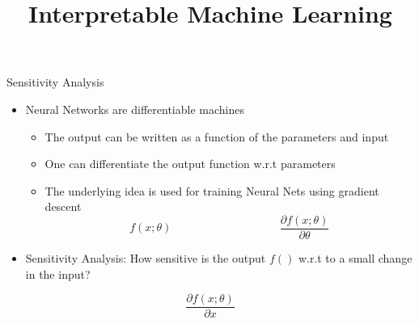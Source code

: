 \documentclass[11pt,compress,t,notes=noshow, aspectratio=169, xcolor=table]{beamer}
\title{Interpretable Machine Learning}
\date{}
\begin{document}
	\graphicspath{ {./figure/} }

\newcommand{\titlefigure}{figure/img138}
\newcommand{\learninggoals}{
\item TBA
\item TBA
\item TBA}



\begin{frame}{Sensitivity Analysis}
    \begin{itemize}
        \item Neural Networks are differentiable machines
        \begin{itemize}
            \item The output can be written as a function of the parameters and input
            \item One can differentiate the output function w.r.t parameters
            \item The underlying idea is used for training Neural Nets using gradient descent
            \begin{equation*}
                f(x;\theta)\hspace{4cm}  \frac{\partial f(x;\theta)}{\partial\theta}
            \end{equation*}
        \end{itemize}
        \item Sensitivity Analysis: How sensitive is the output $f()$ w.r.t to a small change in the
input?
    \end{itemize}
    \pause
    \bigskip
     \begin{equation*}
                 \frac{\partial f(x;\theta)}{\partial x}
            \end{equation*}
\end{frame}
	
\end{document}
